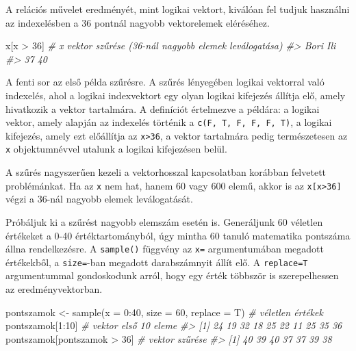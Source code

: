 \documentclass[
]{book}
\newenvironment{Shaded}{\begin{snugshade}}{\end{snugshade}}
\newcommand{\AttributeTok}[1]{\textcolor[rgb]{0.77,0.63,0.00}{#1}}
\newcommand{\CommentTok}[1]{\textcolor[rgb]{0.56,0.35,0.01}{\textit{#1}}}
\newcommand{\DecValTok}[1]{\textcolor[rgb]{0.00,0.00,0.81}{#1}}
\newcommand{\FunctionTok}[1]{\textcolor[rgb]{0.00,0.00,0.00}{#1}}
\newcommand{\NormalTok}[1]{#1}
\newcommand{\OtherTok}[1]{\textcolor[rgb]{0.56,0.35,0.01}{#1}}
\newcommand{\SpecialCharTok}[1]{\textcolor[rgb]{0.00,0.00,0.00}{#1}}
\begin{document}
A relációs művelet eredményét, mint logikai vektort, kiválóan fel tudjuk használni az indexelésben a 36 pontnál nagyobb vektorelemek eléréséhez.

\begin{Shaded}
\begin{Highlighting}[]
\NormalTok{x[x }\SpecialCharTok{\textgreater{}} \DecValTok{36}\NormalTok{]       }\CommentTok{\# x vektor szűrése (36{-}nál nagyobb elemek leválogatása)}
\CommentTok{\#\textgreater{} Bori  Ili }
\CommentTok{\#\textgreater{}   37   40}
\end{Highlighting}
\end{Shaded}

A fenti sor az első példa szűrésre. A szűrés lényegében logikai vektorral való indexelés, ahol a logikai indexvektort egy olyan logikai kifejezés állítja elő, amely hivatkozik a vektor tartalmára. A definíciót értelmezve a példára: a logikai vektor, amely alapján az indexelés történik a \texttt{c(F,\ T,\ F,\ F,\ F,\ T)}, a logikai kifejezés, amely ezt előállítja az \texttt{x\textgreater{}36}, a vektor tartalmára pedig természetesen az \texttt{x} objektumnévvel utalunk a logikai kifejezésen belül.

A szűrés nagyszerűen kezeli a vektorhosszal kapcsolatban korábban felvetett problémánkat. Ha az \texttt{x} nem hat, hanem 60 vagy 600 elemű, akkor is az \texttt{x{[}x\textgreater{}36{]}} végzi a 36-nál nagyobb elemek leválogatását.

Próbáljuk ki a szűrést nagyobb elemszám esetén is. Generáljunk 60 véletlen értékeket a 0-40 értéktartományból, úgy mintha 60 tanuló matematika pontszáma állna rendelkezésre. A \texttt{sample()} függvény az \texttt{x=} argumentumában megadott értékekből, a \texttt{size=}-ban megadott darabszámnyit állít elő. A \texttt{replace=T} argumentummal gondoskodunk arról, hogy egy érték többször is szerepelhessen az eredményvektorban.

\begin{Shaded}
\begin{Highlighting}[]
\NormalTok{pontszamok }\OtherTok{\textless{}{-}} \FunctionTok{sample}\NormalTok{(}\AttributeTok{x =} \DecValTok{0}\SpecialCharTok{:}\DecValTok{40}\NormalTok{, }\AttributeTok{size =} \DecValTok{60}\NormalTok{, }\AttributeTok{replace =}\NormalTok{ T) }\CommentTok{\# véletlen értékek}
\NormalTok{pontszamok[}\DecValTok{1}\SpecialCharTok{:}\DecValTok{10}\NormalTok{]               }\CommentTok{\# vektor első 10 eleme}
\CommentTok{\#\textgreater{}  [1] 24 19 32 18 25 22 11 25 35 36}
\NormalTok{pontszamok[pontszamok }\SpecialCharTok{\textgreater{}} \DecValTok{36}\NormalTok{]    }\CommentTok{\# vektor szűrése}
\CommentTok{\#\textgreater{} [1] 40 39 40 37 37 39 38}
\end{Highlighting}
\end{Shaded}
\end{document}
